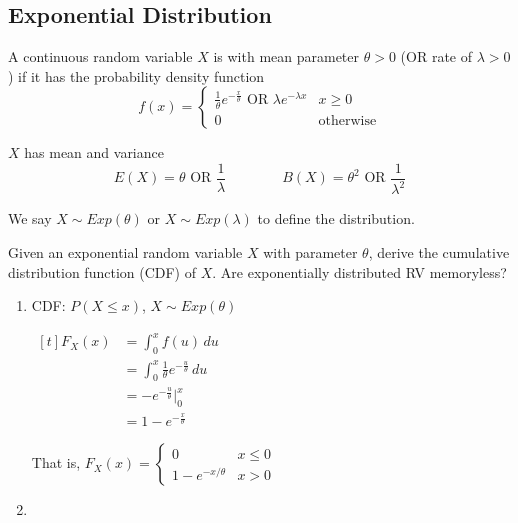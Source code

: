 \subsection{Exponential Distribution}


\begin{definition}
    A continuous random variable $X$ is  with mean parameter $\theta > 0$ (OR rate of $\lambda > 0$) if it has the probability density function $$f(x) = \begin{cases} \frac{1}{\theta} e^{-\frac{x}{\theta}} \text{ OR } \lambda e^{-\lambda x} & x \ge 0 \\ 0 & \text{otherwise} \end{cases}$$

    $X$ has mean and variance $$E(X) = \theta \text{ OR } \frac{1}{\lambda} \qquad \qquad B(X) = \theta^2 \text{ OR } \frac{1}{\lambda^2}$$

    We say $X \sim Exp(\theta)$ or $X \sim Exp(\lambda)$ to define the distribution. 
\end{definition}

\begin{definition}
    Given an exponential random variable $X$ with parameter $\theta$, derive the cumulative distribution function (CDF) of $X$. Are exponentially distributed RV memoryless?

    \begin{enumerate}
        \item CDF: $P(X \le x)$, $X \sim Exp(\theta)$
        
        $\begin{aligned}[t]
            F_X(x) & = \int_0^x f(u) \,du \\
            & = \int_0^x \frac{1}{\theta} e^{-\frac{u}{\theta}} \,du \\
            & = -e^{-\frac{u}{\theta}} \bigg|_{0}^x \\
            & = 1 - e^{-\frac{x}{\theta}}
        \end{aligned}$

        That is, $F_X(x) = \begin{cases} 0 & x \le 0 \\ 1 - e^{-x/\theta} & x > 0 \end{cases}$

        \item %
    \end{enumerate}
\end{definition}

